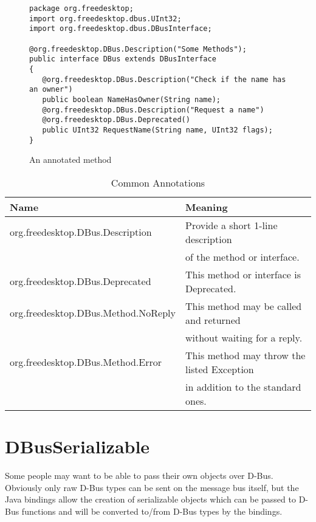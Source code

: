\documentclass[a4paper,12pt]{article}
\begin{document}
\begin{figure}[htb]
\begin{center}
\begin{verbatim}
package org.freedesktop;
import org.freedesktop.dbus.UInt32;
import org.freedesktop.dbus.DBusInterface;

@org.freedesktop.DBus.Description("Some Methods");
public interface DBus extends DBusInterface
{
   @org.freedesktop.DBus.Description("Check if the name has an owner")
   public boolean NameHasOwner(String name);
   @org.freedesktop.DBus.Description("Request a name")
   @org.freedesktop.DBus.Deprecated()
   public UInt32 RequestName(String name, UInt32 flags);
}
\end{verbatim}
\end{center}
\caption{An annotated method}
\label{fig:annotation}
\end{figure}


\begin{table}[htb]
\begin{tabular}{l|l}
{\bf Name} & {\bf Meaning} \\
\hline
org.freedesktop.DBus.Description & Provide a short 1-line description \\
      & of the method or interface. \\
org.freedesktop.DBus.Deprecated & This method or interface is Deprecated. \\
org.freedesktop.DBus.Method.NoReply & This method may be called and returned \\
   & without waiting for a reply. \\
org.freedesktop.DBus.Method.Error & This method may throw the listed Exception\\
   & in addition to the standard ones. \\
\end{tabular}
\caption{Common Annotations}
\label{tab:annotations}
\end{table}

\section{DBusSerializable}

Some people may want to be able to pass their own objects over D-Bus. Obviously
only raw D-Bus types can be sent on the message bus itself, but the Java
bindings allow the creation of serializable objects which can be passed to
D-Bus functions and will be converted to/from D-Bus types by the bindings.
\end{document}
